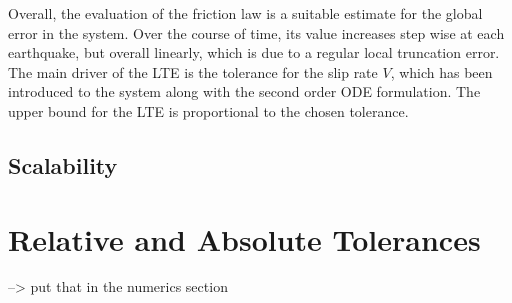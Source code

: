 Overall, the evaluation of the friction law is a suitable estimate for the global error in the system. Over the course of time, its value increases step wise at each earthquake, but overall linearly, which is due to a regular local truncation error. The main driver of the LTE is the tolerance for the slip rate $V$, which has been introduced to the system along with the second order ODE formulation. The upper bound for the LTE is proportional to the chosen tolerance.

\subsection{Scalability}

\section{Relative and Absolute Tolerances}
--> put that in the numerics section

